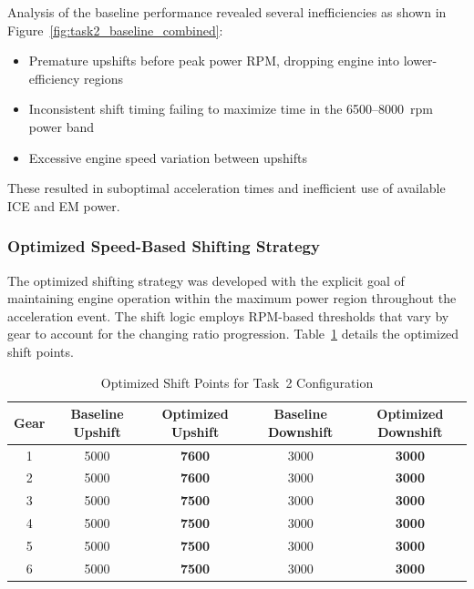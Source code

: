 Analysis of the baseline performance revealed several inefficiencies as shown in Figure~\ref{fig:task2_baseline_combined}:

\begin{itemize}
    \item Premature upshifts before peak power RPM, dropping engine into lower-efficiency regions
    \item Inconsistent shift timing failing to maximize time in the 6500--8000~rpm power band
    \item Excessive engine speed variation between upshifts
\end{itemize}

These resulted in suboptimal acceleration times and inefficient use of available ICE and EM power.

\subsubsection{Optimized Speed-Based Shifting Strategy}

The optimized shifting strategy was developed with the explicit goal of maintaining engine operation within the maximum power region throughout the acceleration event. The shift logic employs RPM-based thresholds that vary by gear to account for the changing ratio progression. Table~\ref{tab:task2_shift_timings} details the optimized shift points.

\begin{table}[H]
\centering
\caption{Optimized Shift Points for Task~2 Configuration}
\label{tab:task2_shift_timings}
\small
\begin{tabular}{@{}ccccc@{}}
\toprule
\textbf{Gear} & \textbf{Baseline Upshift} & \textbf{Optimized Upshift} & \textbf{Baseline Downshift} & \textbf{Optimized Downshift} \\
\midrule
1 & 5000 & \textcolor{optimizedcolor}{\textbf{7600}} & 3000 & \textcolor{optimizedcolor}{\textbf{3000}} \\
2 & 5000 & \textcolor{optimizedcolor}{\textbf{7600}} & 3000 & \textcolor{optimizedcolor}{\textbf{3000}} \\
3 & 5000 & \textcolor{optimizedcolor}{\textbf{7500}} & 3000 & \textcolor{optimizedcolor}{\textbf{3000}} \\
4 & 5000 & \textcolor{optimizedcolor}{\textbf{7500}} & 3000 & \textcolor{optimizedcolor}{\textbf{3000}} \\
5 & 5000 & \textcolor{optimizedcolor}{\textbf{7500}} & 3000 & \textcolor{optimizedcolor}{\textbf{3000}} \\
6 & 5000 & \textcolor{optimizedcolor}{\textbf{7500}} & 3000 & \textcolor{optimizedcolor}{\textbf{3000}} \\
\bottomrule
\end{tabular}
\end{table}

